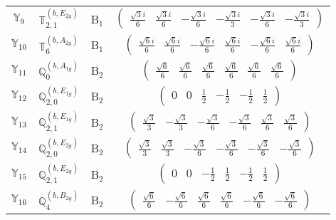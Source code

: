 \documentclass[fleqn,10pt,landscape]{article}
\begin{document}
\begin{itemize}
\begin{center}
\begin{longtable}{c|c|c|c}
$ \mathbb{Y}_{9} $ & $\mathbb{T}_{2,1}^{(b,E_{2g})}$ & B$_{1}$ & $\begin{pmatrix} \frac{\sqrt{3} i}{6} & \frac{\sqrt{3} i}{6} & - \frac{\sqrt{3} i}{6} & - \frac{\sqrt{3} i}{3} & - \frac{\sqrt{3} i}{6} & - \frac{\sqrt{3} i}{3} \end{pmatrix}$ \\
$ \mathbb{Y}_{10} $ & $\mathbb{T}_{6}^{(b,A_{2g})}$ & B$_{1}$ & $\begin{pmatrix} \frac{\sqrt{6} i}{6} & \frac{\sqrt{6} i}{6} & - \frac{\sqrt{6} i}{6} & \frac{\sqrt{6} i}{6} & - \frac{\sqrt{6} i}{6} & \frac{\sqrt{6} i}{6} \end{pmatrix}$ \\ \hline
$ \mathbb{Y}_{11} $ & $\mathbb{Q}_{0}^{(b,A_{1g})}$ & B$_{2}$ & $\begin{pmatrix} \frac{\sqrt{6}}{6} & \frac{\sqrt{6}}{6} & \frac{\sqrt{6}}{6} & \frac{\sqrt{6}}{6} & \frac{\sqrt{6}}{6} & \frac{\sqrt{6}}{6} \end{pmatrix}$ \\
$ \mathbb{Y}_{12} $ & $\mathbb{Q}_{2,0}^{(b,E_{1g})}$ & B$_{2}$ & $\begin{pmatrix} 0 & 0 & \frac{1}{2} & - \frac{1}{2} & - \frac{1}{2} & \frac{1}{2} \end{pmatrix}$ \\
$ \mathbb{Y}_{13} $ & $\mathbb{Q}_{2,1}^{(b,E_{1g})}$ & B$_{2}$ & $\begin{pmatrix} \frac{\sqrt{3}}{3} & - \frac{\sqrt{3}}{3} & - \frac{\sqrt{3}}{6} & - \frac{\sqrt{3}}{6} & \frac{\sqrt{3}}{6} & \frac{\sqrt{3}}{6} \end{pmatrix}$ \\
$ \mathbb{Y}_{14} $ & $\mathbb{Q}_{2,0}^{(b,E_{2g})}$ & B$_{2}$ & $\begin{pmatrix} \frac{\sqrt{3}}{3} & \frac{\sqrt{3}}{3} & - \frac{\sqrt{3}}{6} & - \frac{\sqrt{3}}{6} & - \frac{\sqrt{3}}{6} & - \frac{\sqrt{3}}{6} \end{pmatrix}$ \\
$ \mathbb{Y}_{15} $ & $\mathbb{Q}_{2,1}^{(b,E_{2g})}$ & B$_{2}$ & $\begin{pmatrix} 0 & 0 & - \frac{1}{2} & \frac{1}{2} & - \frac{1}{2} & \frac{1}{2} \end{pmatrix}$ \\
$ \mathbb{Y}_{16} $ & $\mathbb{Q}_{4}^{(b,B_{2g})}$ & B$_{2}$ & $\begin{pmatrix} \frac{\sqrt{6}}{6} & - \frac{\sqrt{6}}{6} & \frac{\sqrt{6}}{6} & \frac{\sqrt{6}}{6} & - \frac{\sqrt{6}}{6} & - \frac{\sqrt{6}}{6} \end{pmatrix}$ \\ \hline

\end{longtable}
\end{center}
\end{itemize}
\end{document}
